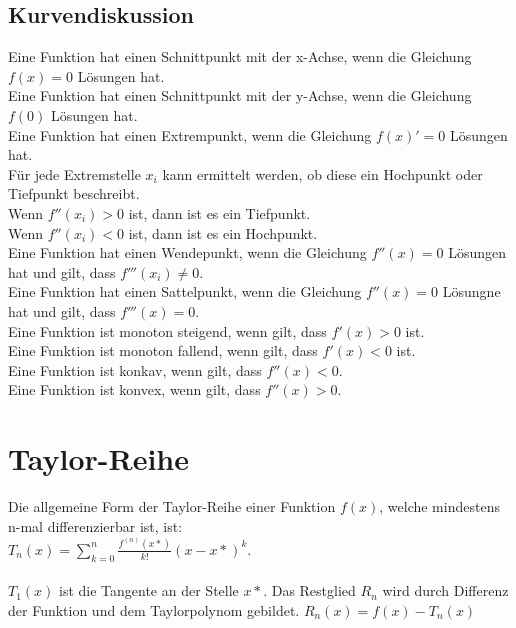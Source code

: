 \documentclass[a4paper,landscape, 11pt]{article}
\begin{document}
\begin{multicols}{4}
\begin{small}
              \subsection{Kurvendiskussion}
                  Eine Funktion hat einen Schnittpunkt mit der x-Achse, wenn die Gleichung $f(x) = 0$ Lösungen hat. \\
                  Eine Funktion hat einen Schnittpunkt mit der y-Achse, wenn die Gleichung $f(0)$ Lösungen hat.\\
                  Eine Funktion hat einen Extrempunkt, wenn die Gleichung $f(x)' = 0$ Lösungen hat. \\
                  Für jede Extremstelle $x_i$ kann ermittelt werden, ob diese ein Hochpunkt oder Tiefpunkt beschreibt.\\
                  Wenn $f''(x_i) > 0$ ist, dann ist es ein Tiefpunkt.\\
                  Wenn $f''(x_i) < 0$ ist, dann ist es ein Hochpunkt. \\
                  Eine Funktion hat einen Wendepunkt, wenn die Gleichung $f''(x) = 0$ Lösungen hat und gilt, dass $f'''(x_i) \neq 0$. \\
                  Eine Funktion hat einen Sattelpunkt, wenn die Gleichung $f''(x) = 0$ Lösungne hat und gilt, dass $f'''(x) = 0$. \\
                  Eine Funktion ist monoton steigend, wenn gilt, dass $f'(x) > 0$ ist. \\
                  Eine Funktion ist monoton fallend, wenn gilt, dass $f'(x) < 0$ ist. \\
                  Eine Funktion ist konkav, wenn gilt, dass $f''(x) < 0$.\\
                  Eine Funktion ist konvex, wenn gilt, dass $f''(x) > 0$.
                   	 
    \section{Taylor-Reihe}
        Die allgemeine Form der Taylor-Reihe einer Funktion $f(x)$, welche mindestens n-mal differenzierbar ist, ist: \\
        $T_n(x) = \sum_{k=0}^{n} \frac{f^{(n)}(x*)}{k!}(x - x*)^k$.
        \\ \\
        $T_1(x)$ ist die Tangente an der Stelle $x*$.
        Das Restglied $R_n$ wird durch Differenz der Funktion und dem Taylorpolynom gebildet. $R_n(x) = f(x) - T_n(x)$
        

\end{small}
\end{multicols}
\end{document}
